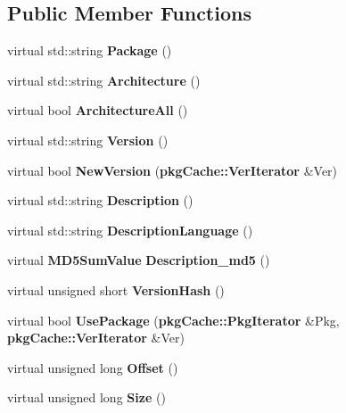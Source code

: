 \subsection*{\-Public \-Member \-Functions}
\begin{DoxyCompactItemize}
\item 
virtual std\-::string {\bfseries \-Package} ()\label{classdebListParser_a0b42356a52e3169904ae52d71934f5c9}

\item 
virtual std\-::string {\bfseries \-Architecture} ()\label{classdebListParser_a71b60d67125bb5fa8dc6da7544252e7b}

\item 
virtual bool {\bfseries \-Architecture\-All} ()\label{classdebListParser_a2e8b73423d5e4e54a00f1e44949a2577}

\item 
virtual std\-::string {\bfseries \-Version} ()\label{classdebListParser_a5db809ed0cf913a48d41fa93ec17e90b}

\item 
virtual bool {\bfseries \-New\-Version} ({\bf pkg\-Cache\-::\-Ver\-Iterator} \&\-Ver)\label{classdebListParser_ab0739a9acf5509c3381d49350f6c4cc0}

\item 
virtual std\-::string {\bfseries \-Description} ()\label{classdebListParser_ad34624ea7e2500b95e4f44dcffb215c6}

\item 
virtual std\-::string {\bfseries \-Description\-Language} ()\label{classdebListParser_a84a5d2c87819e93b88e83c6b3afdbe79}

\item 
virtual {\bf \-M\-D5\-Sum\-Value} {\bfseries \-Description\-\_\-md5} ()\label{classdebListParser_af6e909cae5e99d04567e77aade983b66}

\item 
virtual unsigned short {\bfseries \-Version\-Hash} ()\label{classdebListParser_a1817727f21ff86bb623fd169cd4bcee0}

\item 
virtual bool {\bfseries \-Use\-Package} ({\bf pkg\-Cache\-::\-Pkg\-Iterator} \&\-Pkg, {\bf pkg\-Cache\-::\-Ver\-Iterator} \&\-Ver)\label{classdebListParser_a856dbb6832b5a820d3fec867298979aa}

\item 
virtual unsigned long {\bfseries \-Offset} ()\label{classdebListParser_a522e22486c2fd3219fad98a9df5f0ab2}

\item 
virtual unsigned long {\bfseries \-Size} ()\label{classdebListParser_ae515cee0e23177097ae899aa6249d3f3}


\end{DoxyCompactItemize}
